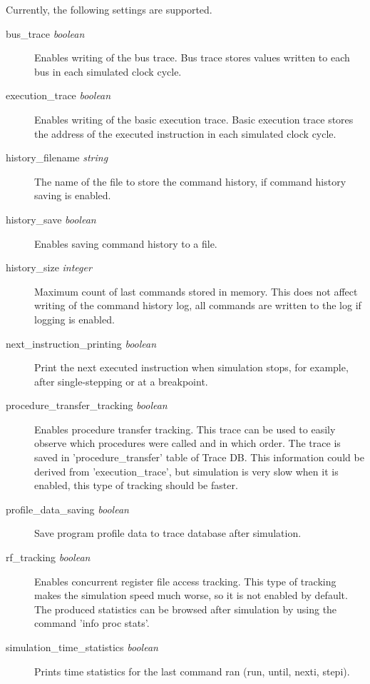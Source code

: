 \documentclass[a4paper,twoside]{tceusermanual}
\begin{document}
Currently, the following settings are supported.

\begin{description}
\item[bus\_trace {\emph{boolean}}] %
  Enables writing of the bus trace. Bus trace stores values written to each bus
in each simulated clock cycle.

\item[execution\_trace  {\emph{boolean}}] %
  Enables writing of the basic execution trace. Basic execution trace stores the
address of the executed instruction in each simulated clock cycle. 

\item[history\_filename {\emph{string}}]%
  The name of the file to store the command history, if command history saving
is enabled.

\item[history\_save {\emph{boolean}}] %
  Enables saving command history to a file.

\item[history\_size {\emph{integer}}]%
 Maximum count of last commands stored in memory. This does not affect writing
of the command history log, all commands are written to the log if logging is
enabled.

\item[next\_instruction\_printing {\emph{boolean}}]%
Print the next executed instruction when simulation stops, for example,
after single-stepping or at a breakpoint. 

\item[procedure\_transfer\_tracking {\emph{boolean}}]%
 Enables procedure transfer tracking. This trace can be used to easily
observe which procedures were 
 called and in which order. The trace is saved in 'procedure\_transfer'
table of Trace DB. This information
 could be derived from 'execution\_trace', but simulation is very slow when
it is enabled, this type of
 tracking should be faster.

\item[profile\_data\_saving {\emph{boolean}}]%
Save program profile data to trace database after simulation.

\item[rf\_tracking {\emph{boolean}}]%
 Enables concurrent register file access tracking. This type of tracking
makes the simulation
 speed much worse, so it is not enabled by default. The produced statistics can
be browsed after simulation by using the command 'info proc stats'.

\item[simulation\_time\_statistics {\emph{boolean}}]%
Prints time statistics for the last command ran (run, until, nexti, stepi).


\end{description}
\end{document}
